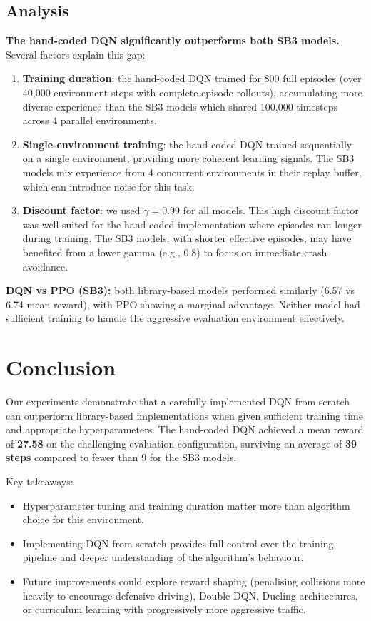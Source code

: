 \documentclass[11pt,a4paper]{article}
\begin{document}
\subsection{Analysis}

\textbf{The hand-coded DQN significantly outperforms both SB3 models.} Several factors explain this gap:

\begin{enumerate}
    \item \textbf{Training duration}: the hand-coded DQN trained for 800 full episodes (over 40,000 environment steps with complete episode rollouts), accumulating more diverse experience than the SB3 models which shared 100,000 timesteps across 4 parallel environments.

    \item \textbf{Single-environment training}: the hand-coded DQN trained sequentially on a single environment, providing more coherent learning signals. The SB3 models mix experience from 4 concurrent environments in their replay buffer, which can introduce noise for this task.

    \item \textbf{Discount factor}: we used $\gamma = 0.99$ for all models. This high discount factor was well-suited for the hand-coded implementation where episodes ran longer during training. The SB3 models, with shorter effective episodes, may have benefited from a lower gamma (e.g., 0.8) to focus on immediate crash avoidance.
\end{enumerate}

\textbf{DQN vs PPO (SB3):} both library-based models performed similarly (6.57 vs 6.74 mean reward), with PPO showing a marginal advantage. Neither model had sufficient training to handle the aggressive evaluation environment effectively.

\section{Conclusion}

Our experiments demonstrate that a carefully implemented DQN from scratch can outperform library-based implementations when given sufficient training time and appropriate hyperparameters. The hand-coded DQN achieved a mean reward of \textbf{27.58} on the challenging evaluation configuration, surviving an average of \textbf{39 steps} compared to fewer than 9 for the SB3 models.

Key takeaways:
\begin{itemize}[nosep]
    \item Hyperparameter tuning and training duration matter more than algorithm choice for this environment.
    \item Implementing DQN from scratch provides full control over the training pipeline and deeper understanding of the algorithm's behaviour.
    \item Future improvements could explore reward shaping (penalising collisions more heavily to encourage defensive driving), Double DQN, Dueling architectures, or curriculum learning with progressively more aggressive traffic.
\end{itemize}
\end{document}

